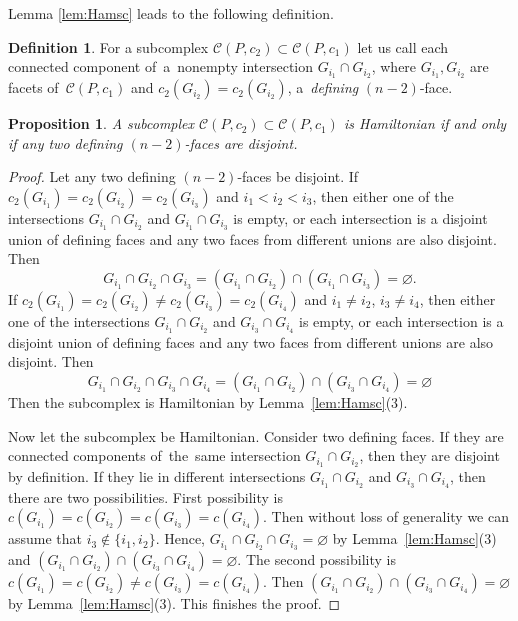 \documentclass[12pt]{amsart}
\newtheorem{proposition}[formula]{Proposition}
\theoremstyle{definition}
\newtheorem{definition}[formula]{Definition}
\theoremstyle{remark}
\begin{document}
Lemma \ref{lem:Hamsc} leads to the following definition.
\begin{definition}\label{def:n-2f}
For a subcomplex $\mathcal{C}(P,c_2)\subset \mathcal{C}(P,c_1)$ let us call
each connected component of~a~nonempty intersection $G_{i_1}\cap G_{i_2}$, where $G_{i_1}, G_{i_2}$ are facets 
of~$\mathcal{C}(P,c_1)$ and $c_2(G_{i_2})=c_2(G_{i_2})$, a~{\it defining} $(n-2)$-face.
\end{definition}
\begin{proposition}\label{cor:n-2f}
A subcomplex $\mathcal{C}(P,c_2)\subset \mathcal{C}(P,c_1)$ is Hamiltonian if and only if any two 
defining $(n-2)$-faces are disjoint.
\end{proposition}
\begin{proof}
Let any two defining $(n-2)$-faces be disjoint. If 
$c_2(G_{i_1})=c_2(G_{i_2})=c_2(G_{i_3})$ and $i_1<i_2<i_3$, then either
one of the intersections $G_{i_1}\cap G_{i_2}$ and $G_{i_1}\cap G_{i_3}$ is empty, or
each intersection is a disjoint union of defining faces and any two faces from different
unions are also disjoint. Then
$$
G_{i_1}\cap G_{i_2}\cap G_{i_3}=(G_{i_1}\cap G_{i_2})\cap (G_{i_1}\cap G_{i_3})=\varnothing.
$$
If $c_2(G_{i_1})=c_2(G_{i_2})\ne c_2(G_{i_3})=c_2(G_{i_4})$ and $i_1\ne i_2$, $i_3\ne i_4$,
then either 
one of the intersections $G_{i_1}\cap G_{i_2}$ and $G_{i_3}\cap G_{i_4}$ is empty, or
each intersection is a disjoint union of defining faces and any two faces from different
unions are also disjoint. Then 
$$
G_{i_1}\cap G_{i_2}\cap G_{i_3}\cap G_{i_4}=(G_{i_1}\cap G_{i_2})\cap (G_{i_3}\cap G_{i_4})=\varnothing
$$
Then the subcomplex is Hamiltonian by Lemma~\ref{lem:Hamsc}(3).

Now let the subcomplex be Hamiltonian. Consider two defining faces. If they are connected components
of~the~same intersection $G_{i_1}\cap G_{i_2}$, then they are disjoint by definition. If they lie in different
intersections $G_{i_1}\cap G_{i_2}$ and $G_{i_3}\cap G_{i_4}$, then there are two possibilities. First possibility is 
$c(G_{i_1})=c(G_{i_2})=c(G_{i_3})=c(G_{i_4})$.  Then without loss of generality we
can assume that $i_3\notin\{i_1,i_2\}$. Hence,  $G_{i_1}\cap G_{i_2}\cap G_{i_3}=\varnothing$ by Lemma~\ref{lem:Hamsc}(3)
and $(G_{i_1}\cap G_{i_2})\cap (G_{i_3}\cap G_{i_4})=\varnothing$. The second possibility is 
$c(G_{i_1})=c(G_{i_2})\ne c(G_{i_3})=c(G_{i_4})$. Then $(G_{i_1}\cap G_{i_2})\cap (G_{i_3}\cap G_{i_4})=\varnothing$
by  Lemma~\ref{lem:Hamsc}(3). This finishes the proof.
\end{proof}
\end{document}
